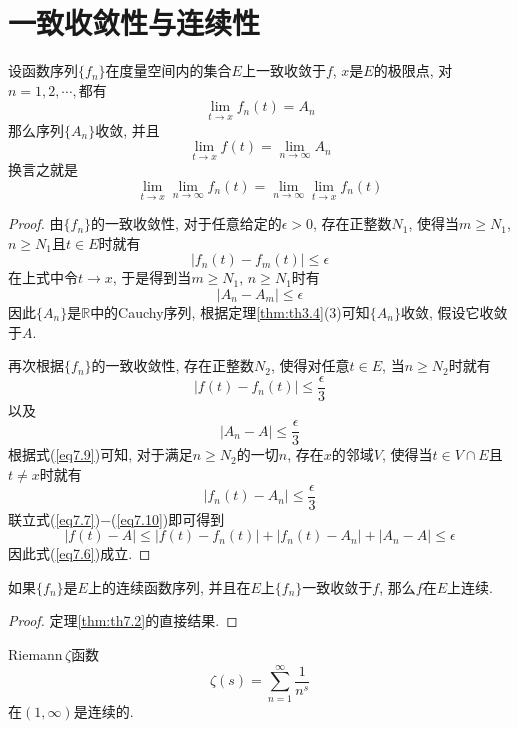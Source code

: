 \documentclass[cn,12pt,math=mtpro2,citestyle=gb7714-2015,bibstyle=gb7714-2015,twocol]{elegantbook}
\newcommand{\R}{\mathbb{R}}
\newcommand{\limn }{\lim_{n\to\infty}}
\begin{document}
\section{一致收敛性与连续性}
\begin{theorem}\label{thm:th7.2}
  设函数序列$\{f_n\}$在度量空间内的集合$E$上一致收敛于$f$, $x$是$E$的极限点, 对$n=1,2,\cdots,$都有
  \begin{equation}\label{eq7.9}
    \lim_{t\to x}f_n(t)=A_n
  \end{equation}
  那么序列$\{A_n\}$收敛, 并且
  \begin{equation}\label{eq7.6}
    \lim_{t\to x}f(t)=\limn A_n
  \end{equation}
  换言之就是
  $$\lim_{t\to x}\limn f_n(t)=\limn \lim_{t\to x}f_n(t)$$
\end{theorem}
\begin{proof}
  由$\{f_n\}$的一致收敛性, 对于任意给定的$\epsilon>0$, 存在正整数$N_1$, 使得当$m\geq N_1$, $n\geq N_1$且$t\in E$时就有
  $$|f_n(t)-f_m(t)|\leq\epsilon$$
  在上式中令$t\to x$, 于是得到当$m\geq N_1$, $n\geq N_1$时有
  $$|A_n-A_m|\leq\epsilon$$
  因此$\{A_n\}$是$\R$中的Cauchy序列, 根据定理\ref{thm:th3.4}(3)可知$\{A_n\}$收敛, 假设它收敛于$A$.

  再次根据$\{f_n\}$的一致收敛性, 存在正整数$N_2$, 使得对任意$t\in E$, 当$n\geq N_2$时就有
  \begin{equation}\label{eq7.7}
    |f(t)-f_n(t)|\leq\frac{\epsilon}{3}
  \end{equation}
  以及
  \begin{equation}\label{eq7.8}
    |A_n-A|\leq\frac{\epsilon}{3}
  \end{equation}
  根据式(\ref{eq7.9})可知, 对于满足$n\geq N_2$的一切$n$, 存在$x$的邻域$V$, 使得当$t\in V\cap E$且$t\neq x$时就有
  \begin{equation}\label{eq7.10}
    |f_n(t)-A_n|\leq\frac{\epsilon}{3}
  \end{equation}
  联立式(\ref{eq7.7})$-$(\ref{eq7.10})即可得到
  $$|f(t)-A|\leq|f(t)-f_n(t)|+|f_n(t)-A_n|+|A_n-A|\leq\epsilon$$
  因此式(\ref{eq7.6})成立.

\end{proof}
\begin{theorem}\label{thm:th7.3}
如果$\{f_n\}$是$E$上的连续函数序列, 并且在$E$上$\{f_n\}$一致收敛于$f$, 那么$f$在$E$上连续.
\end{theorem}
\begin{proof}
定理\ref{thm:th7.2}的直接结果.
\end{proof}
\begin{example}
Riemann$\,\zeta$函数
$$\zeta(s)=\sum_{n=1}^{\infty}\frac{1}{n^s}$$
在$(1,\infty)$是连续的.
\end{example}
\end{document}
